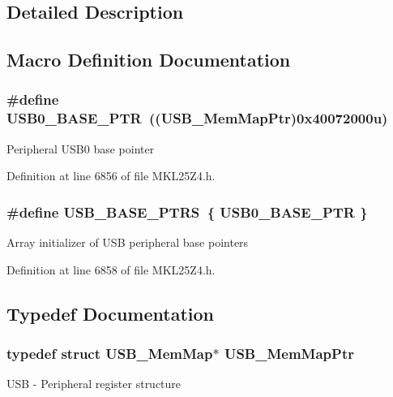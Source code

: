 \subsection{Detailed Description}


\subsection{Macro Definition Documentation}
\subsubsection[{\texorpdfstring{U\+S\+B0\+\_\+\+B\+A\+S\+E\+\_\+\+P\+TR}{USB0_BASE_PTR}}]{\setlength{\rightskip}{0pt plus 5cm}\#define U\+S\+B0\+\_\+\+B\+A\+S\+E\+\_\+\+P\+TR~(({\bf U\+S\+B\+\_\+\+Mem\+Map\+Ptr})0x40072000u)}\hypertarget{group___u_s_b___peripheral_ga598ff5eb20a0551af232710b3f27640a}{}\label{group___u_s_b___peripheral_ga598ff5eb20a0551af232710b3f27640a}
Peripheral U\+S\+B0 base pointer 

Definition at line 6856 of file M\+K\+L25\+Z4.\+h.

\subsubsection[{\texorpdfstring{U\+S\+B\+\_\+\+B\+A\+S\+E\+\_\+\+P\+T\+RS}{USB_BASE_PTRS}}]{\setlength{\rightskip}{0pt plus 5cm}\#define U\+S\+B\+\_\+\+B\+A\+S\+E\+\_\+\+P\+T\+RS~\{ {\bf U\+S\+B0\+\_\+\+B\+A\+S\+E\+\_\+\+P\+TR} \}}\hypertarget{group___u_s_b___peripheral_gabb481a231c7c57907377d7ee985f826c}{}\label{group___u_s_b___peripheral_gabb481a231c7c57907377d7ee985f826c}
Array initializer of U\+SB peripheral base pointers 

Definition at line 6858 of file M\+K\+L25\+Z4.\+h.



\subsection{Typedef Documentation}
\subsubsection[{\texorpdfstring{U\+S\+B\+\_\+\+Mem\+Map\+Ptr}{USB_MemMapPtr}}]{\setlength{\rightskip}{0pt plus 5cm}typedef struct {\bf U\+S\+B\+\_\+\+Mem\+Map}$\ast$ {\bf U\+S\+B\+\_\+\+Mem\+Map\+Ptr}}\hypertarget{group___u_s_b___peripheral_gaabd989a49827dc34abb5de32732f4125}{}\label{group___u_s_b___peripheral_gaabd989a49827dc34abb5de32732f4125}
U\+SB -\/ Peripheral register structure 